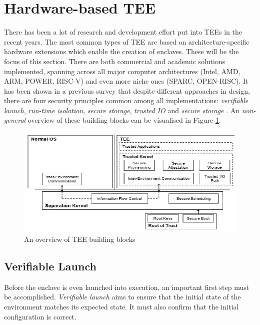 \documentclass[runningheads,a4paper]{uwsese}
\begin{document}


\section{Hardware-based \gls{TEE}}

There has been a lot of research and development effort put into \glspl{TEE} in
the recent years. The most common types of \gls{TEE} are based on
architecture-specific hardware extensions which enable the creation of
enclaves. These will be the focus of this section. There are both commercial
and academic solutions implemented, spanning across all major computer
architectures (Intel, AMD, ARM, POWER, RISC-V) and even more niche ones (SPARC,
OPEN-RISC). It has been shown in a previous survey that despite different
approaches in design, there are four security principles common among all
implementations: \emph{verifiable launch}, \emph{run-time isolation},
\emph{secure storage}, \emph{trusted IO} and \emph{secure storage}
\cite{tee_hw_sup}. An \emph{non-general} overview of these building blocks can be
visualised in Figure \ref{fig:tee_components}.

\begin{figure}[h]
    \centering
    \includegraphics[scale=.7]{tee_components.png}
    \caption{An overview of \gls{TEE} building blocks \cite{tee_is_and_not}}
    \label{fig:tee_components}
\end{figure}

\subsection{Verifiable Launch}

Before the enclave is even launched into execution, an important first step
must be accomplished. \emph{Verifiable launch} aims to ensure that the initial
state of the environment matches its expected state. It must also confirm that
the initial configuration is correct. 
\end{document}
